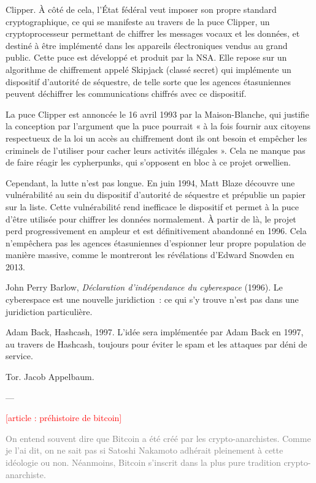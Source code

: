 Clipper. À côté de cela, l'État fédéral veut imposer son propre standard cryptographique, ce qui se manifeste au travers de la puce Clipper, un cryptoprocesseur permettant de chiffrer les messages vocaux et les données, et destiné à être implémenté dans les appareils électroniques vendus au grand public. Cette puce est développé et produit par la NSA. Elle repose sur un algorithme de chiffrement appelé Skipjack (classé secret) qui implémente un dispositif d'autorité de séquestre, de telle sorte que les agences étasuniennes peuvent déchiffrer les communications chiffrés avec ce dispositif.

La puce Clipper est annoncée le 16 avril 1993 par la Maison-Blanche, qui justifie la conception par l'argument que la puce pourrait « à la fois fournir aux citoyens respectueux de la loi un accès au chiffrement dont ils ont besoin et empêcher les criminels de l'utiliser pour cacher leurs activités illégales ». Cela ne manque pas de faire réagir les cypherpunks, qui s'opposent en bloc à ce projet orwellien.

Cependant, la lutte n'est pas longue. En juin 1994, Matt Blaze découvre une vulnérabilité au sein du dispositif d'autorité de séquestre et prépublie un papier sur la liste. Cette vulnérabilité rend inefficace le dispositif et permet à la puce d'être utilisée pour chiffrer les données normalement. À partir de là, le projet perd progressivement en ampleur et est définitivement abandonné en 1996. Cela n'empêchera pas les agences étasuniennes d'espionner leur propre population de manière massive, comme le montreront les révélations d'Edward Snowden en 2013.



John Perry Barlow, \emph{Déclaration d'indépendance du cyberespace} (1996). Le cyberespace est une nouvelle juridiction~: ce qui s'y trouve n'est pas dans une juridiction particulière.



Adam Back, Hashcash, 1997. L'idée sera implémentée par Adam Back en 1997, au travers de Hashcash, toujours pour éviter le spam et les attaques par déni de service.

Tor. Jacob Appelbaum.


---

\textcolor{red}{[article : préhistoire de bitcoin]}

\textcolor{gray}{On entend souvent dire que Bitcoin a été créé par les crypto-anarchistes. Comme je l'ai dit, on ne sait pas si Satoshi Nakamoto adhérait pleinement à cette idéologie ou non. Néanmoins, Bitcoin s'inscrit dans la plus pure tradition crypto-anarchiste.}

